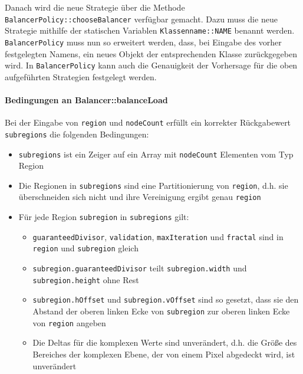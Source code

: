 Danach wird die neue Strategie über die Methode \verb|BalancerPolicy::chooseBalancer| verfügbar gemacht.
Dazu muss die neue Strategie mithilfe der statischen Variablen \verb|Klassenname::NAME| benannt werden.
\verb|BalancerPolicy| muss nun so erweitert werden, dass, bei Eingabe des vorher festgelegten Namens, ein neues Objekt der entsprechenden Klasse zurückgegeben wird.
In \verb|BalancerPolicy| kann auch die Genauigkeit der Vorhersage für die oben aufgeführten Strategien festgelegt werden.

\paragraph*{Bedingungen an Balancer::balanceLoad}
Bei der Eingabe von \verb|region| und \verb|nodeCount| erfüllt ein korrekter Rückgabewert \verb|subregions| die folgenden Bedingungen:
\begin{itemize}
	\item \verb|subregions| ist ein Zeiger auf ein Array mit \verb|nodeCount| Elementen vom Typ Region
	\item Die Regionen in \verb|subregions| sind eine Partitionierung von \verb|region|, d.h. sie überschneiden sich nicht und ihre Vereinigung ergibt genau \verb|region|
	\item Für jede Region \verb|subregion| in \verb|subregions| gilt:
	      \begin{itemize}
		      \item \verb|guaranteedDivisor|, \verb|validation|, \verb|maxIteration| und \verb|fractal| sind in \verb|region| und \verb|subregion| gleich
		      \item \verb|subregion.guaranteedDivisor| teilt \verb|subregion.width| und \\ \verb|subregion.height| ohne Rest
		      \item \verb|subregion.hOffset| und \verb|subregion.vOffset| sind so gesetzt, dass sie den Abstand der oberen linken Ecke von \verb|subregion| zur oberen linken Ecke von \verb|region| angeben
		      \item Die Deltas für die komplexen Werte sind unverändert, d.h. die Größe des Bereiches der komplexen Ebene, der von einem Pixel abgedeckt wird, ist unverändert
	      \end{itemize}
\end{itemize}

